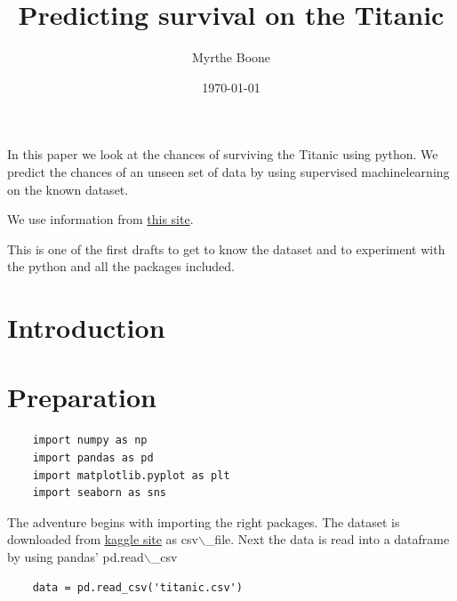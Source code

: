 \documentclass[11pt]{article}
\author{Myrthe Boone}
\date{\today}
\title{Predicting survival on the Titanic}
\begin{document}
\tableofcontents

In this paper we look at the chances of surviving the Titanic using
python. We predict the chances of an unseen set of data by using
supervised machinelearning on the known dataset.

We use information from \href{http://www.encyclopedia-titanica.org}{this
site}.

This is one of the first drafts to get to know the dataset and to
experiment with the python and all the packages included.

\section{Introduction}
\label{introduction}

\section{Preparation}
\label{preparation}
\begin{verbatim}
    import numpy as np
    import pandas as pd
    import matplotlib.pyplot as plt
    import seaborn as sns
\end{verbatim}

The adventure begins with importing the right packages. The dataset is
downloaded from \href{https://www.kaggle.com/c/titanic/data}{kaggle site}
as csv$\backslash$\_file. Next the data is read into a dataframe by using pandas'
pd.read$\backslash$\_csv

\begin{verbatim}
    data = pd.read_csv('titanic.csv')
\end{verbatim}
\end{document}
